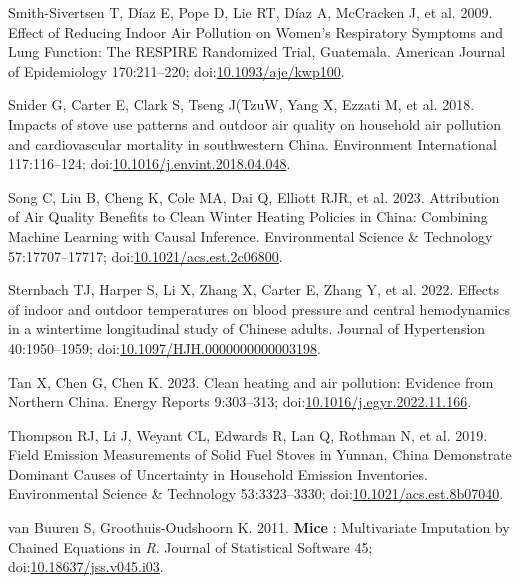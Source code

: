 \documentclass[
  letterpaper,
  DIV=11,
  numbers=noendperiod]{scrartcl}
\newlength{\cslhangindent}
\newlength{\cslentryspacingunit} %
\newenvironment{CSLReferences}[2] %
 {%
  \setlength{\parindent}{0pt}
  \ifodd #1
  \let\oldpar\par
  \def\par{\hangindent=\cslhangindent\oldpar}
  \fi
  \setlength{\parskip}{#2\cslentryspacingunit}
 }%
 {}
\begin{document}
\begin{CSLReferences}{1}{0}
\leavevmode{}%
Smith-Sivertsen T, Díaz E, Pope D, Lie RT, Díaz A, McCracken J, et al.
2009. Effect of {Reducing Indoor Air Pollution} on {Women}'s
{Respiratory Symptoms} and {Lung Function}: {The RESPIRE Randomized
Trial}, {Guatemala}. American Journal of Epidemiology 170:211--220;
doi:\href{https://doi.org/10.1093/aje/kwp100}{10.1093/aje/kwp100}.

\leavevmode{}%
Snider G, Carter E, Clark S, Tseng J(TzuW, Yang X, Ezzati M, et al.
2018. Impacts of stove use patterns and outdoor air quality on household
air pollution and cardiovascular mortality in southwestern {China}.
Environment International 117:116--124;
doi:\href{https://doi.org/10.1016/j.envint.2018.04.048}{10.1016/j.envint.2018.04.048}.

\leavevmode{}%
Song C, Liu B, Cheng K, Cole MA, Dai Q, Elliott RJR, et al. 2023.
Attribution of {Air Quality Benefits} to {Clean Winter Heating Policies}
in {China}: {Combining Machine Learning} with {Causal Inference}.
Environmental Science \& Technology 57:17707--17717;
doi:\href{https://doi.org/10.1021/acs.est.2c06800}{10.1021/acs.est.2c06800}.

\leavevmode{}%
Sternbach TJ, Harper S, Li X, Zhang X, Carter E, Zhang Y, et al. 2022.
Effects of indoor and outdoor temperatures on blood pressure and central
hemodynamics in a wintertime longitudinal study of {Chinese} adults.
Journal of Hypertension 40:1950--1959;
doi:\href{https://doi.org/10.1097/HJH.0000000000003198}{10.1097/HJH.0000000000003198}.

\leavevmode{}%
Tan X, Chen G, Chen K. 2023. Clean heating and air pollution: {Evidence}
from {Northern China}. Energy Reports 9:303--313;
doi:\href{https://doi.org/10.1016/j.egyr.2022.11.166}{10.1016/j.egyr.2022.11.166}.

\leavevmode{}%
Thompson RJ, Li J, Weyant CL, Edwards R, Lan Q, Rothman N, et al. 2019.
Field {Emission Measurements} of {Solid Fuel Stoves} in {Yunnan}, {China
Demonstrate Dominant Causes} of {Uncertainty} in {Household Emission
Inventories}. Environmental Science \& Technology 53:3323--3330;
doi:\href{https://doi.org/10.1021/acs.est.8b07040}{10.1021/acs.est.8b07040}.

\leavevmode{}%
van Buuren S, Groothuis-Oudshoorn K. 2011. {\textbf{Mice}} :
{Multivariate Imputation} by {Chained Equations} in {\emph{R}}. Journal
of Statistical Software 45;
doi:\href{https://doi.org/10.18637/jss.v045.i03}{10.18637/jss.v045.i03}.


\end{CSLReferences}
\end{document}
